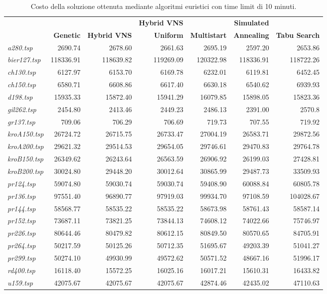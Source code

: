 {\footnotesize
\begin{longtable}[H]{lrrrrrr}
\caption{Costo della soluzione ottenuta mediante algoritmi euristici con time limit di 10 minuti.}\\
\hline
{} & {} & {} & \textbf{Hybrid VNS} & {} & \textbf{Simulated} & {}\\
{} & \textbf{Genetic} & \textbf{Hybrid VNS} & \textbf{Uniform} & \textbf{Multistart} & \textbf{Annealing} & \textbf{Tabu Search}\\
\hline
\textit{a280.tsp} & 2690.74 & 2678.60 & 2661.63 & 2695.19 & 2597.20 & 2653.86\\
\textit{bier127.tsp} & 118336.91 & 118639.82 & 119269.09 & 120322.98 & 118336.91 & 118722.26\\
\textit{ch130.tsp} & 6127.97 & 6153.70 & 6169.78 & 6232.01 & 6119.81 & 6452.45\\
\textit{ch150.tsp} & 6580.71 & 6608.86 & 6617.40 & 6630.18 & 6540.62 & 6939.93\\
\textit{d198.tsp} & 15935.33 & 15872.40 & 15941.29 & 16079.85 & 15898.05 & 15823.36\\
\textit{gil262.tsp} & 2454.80 & 2413.46 & 2449.23 & 2486.13 & 2391.00 & 2570.8\\
\textit{gr137.tsp} & 709.06 & 706.29 & 706.69 & 719.73 & 707.55 & 719.92\\
\textit{kroA150.tsp} & 26724.72 & 26715.75 & 26733.47 & 27004.19 & 26583.71 & 29872.56\\
\textit{kroA200.tsp} & 29621.32 & 29514.53 & 29654.05 & 29746.61 & 29470.83 & 29764.78\\
\textit{kroB150.tsp} & 26349.62 & 26243.64 & 26563.59 & 26906.92 & 26199.03 & 27428.81\\
\textit{kroB200.tsp} & 30024.80 & 29448.20 & 30012.64 & 30865.99 & 29487.73 & 33509.93\\
\textit{pr124.tsp} & 59074.80 & 59030.74 & 59030.74 & 59408.90 & 60088.84 & 60805.78\\
\textit{pr136.tsp} & 97551.40 & 96890.77 & 97919.03 & 99934.70 & 97108.59 & 104028.67\\
\textit{pr144.tsp} & 58568.77 & 58535.22 & 58535.22 & 58673.98 & 58761.43 & 58587.14\\
\textit{pr152.tsp} & 73687.11 & 73821.25 & 73844.13 & 74608.12 & 74022.66 & 75746.97\\
\textit{pr226.tsp} & 80644.46 & 80479.82 & 80612.15 & 80849.50 & 80570.65 & 84705.91\\
\textit{pr264.tsp} & 50217.59 & 50125.26 & 50712.35 & 51695.67 & 49203.39 & 51041.27\\
\textit{pr299.tsp} & 50274.10 & 49930.99 & 49572.62 & 50571.52 & 48667.16 & 51996.17\\
\textit{rd400.tsp} & 16118.40 & 15572.25 & 16025.16 & 16017.21 & 15610.31 & 16433.82\\
\textit{u159.tsp} & 42075.67 & 42075.67 & 42075.67 & 42874.46 & 42435.02 & 47110.63\\
\hline
\end{longtable}
}

